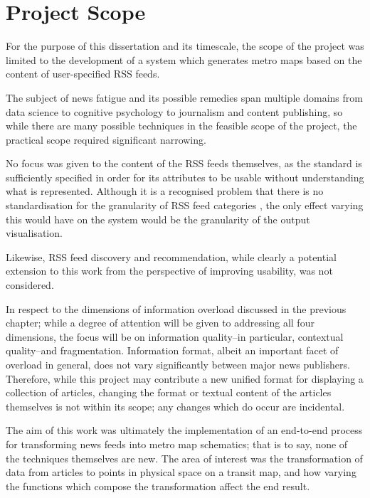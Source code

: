 \section{Project Scope}

For the purpose of this dissertation and its timescale, the scope of the project was limited to the development of a system which generates metro maps based on the content of user-specified RSS feeds.

The subject of news fatigue and its possible remedies span multiple domains from data science to cognitive psychology to journalism and content publishing, so while there are many possible techniques in the feasible scope of the project, the practical scope required significant narrowing.

No focus was given to the content of the RSS feeds themselves, as the standard is sufficiently specified in order for its attributes to be usable without understanding what is represented. Although it is a recognised problem that there is no standardisation for the granularity of RSS feed categories \citep{PersonalNewsRss}, the only effect varying this would have on the system would be the granularity of the output visualisation.

Likewise, RSS feed discovery and recommendation, while clearly a potential extension to this work from the perspective of improving usability, was not considered.

In respect to the dimensions of information overload \citep{TowardsAnOptimalResolutionToInformationOverload} discussed in the previous chapter; while a degree of attention will be given to addressing all four dimensions, the focus will be on information quality--in particular, contextual quality--and fragmentation. Information format, albeit an important facet of overload in general, does not vary significantly between major news publishers. Therefore, while this project may contribute a new unified format for displaying a collection of articles, changing the format or textual content of the articles themselves is not within its scope; any changes which do occur are incidental.

The aim of this work was ultimately the implementation of an end-to-end process for transforming news feeds into metro map schematics; that is to say, none of the techniques themselves are new. The area of interest was the transformation of data from articles to points in physical space on a transit map, and how varying the functions which compose the transformation affect the end result.

